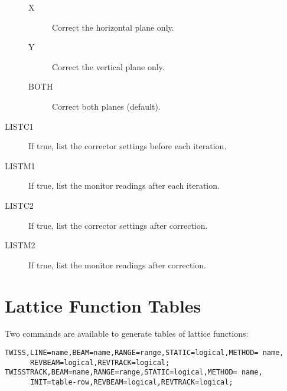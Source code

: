 \begin{description}
\begin{description}
  \item[X]
    Correct the horizontal plane only.
  \item[Y]
    Correct the vertical plane only.
  \item[BOTH]
    Correct both planes (default).
  \end{description}
\item[LISTC1]
  If true, list the corrector settings before each iteration.
\item[LISTM1]
  If true, list the monitor readings after each iteration.
\item[LISTC2]
  If true, list the corrector settings after correction.
\item[LISTM2]
  If true, list the monitor readings after correction.
\end{description}

\section{Lattice Function Tables}
\label{sec:twiss}

Two commands are available to generate tables of lattice functions:
\begin{verbatim}
TWISS,LINE=name,BEAM=name,RANGE=range,STATIC=logical,METHOD= name,
      REVBEAM=logical,REVTRACK=logical;
TWISSTRACK,BEAM=name,RANGE=range,STATIC=logical,METHOD= name,
      INIT=table-row,REVBEAM=logical,REVTRACK=logical;
\end{verbatim}

